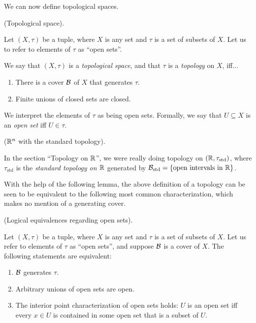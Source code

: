We can now define topological spaces.

\begin{defn}
    (Topological space).
    
    Let $(X, \tau)$ be a tuple, where $X$ is any set and $\tau$ is a set of subsets of $X$. Let us to refer to elements of $\tau$ as ``open sets''.
    
    We say that $(X, \tau)$ is a \textit{topological space}, and that $\tau$ is a \textit{topology} on $X$, iff...

    \begin{enumerate}
        \item There is a cover $\mathcal{B}$ of $X$ that generates $\tau$.
        \item Finite unions of closed sets are closed.
    \end{enumerate}

    We interpret the elements of $\tau$ as being open sets. Formally, we say that $U \subseteq X$ is an \textit{open set} iff $U \in \tau$.
\end{defn}

\begin{remark}
     ($\mathbb{R}^n$ with the standard topology).
     
     In the section ``Topology on $\mathbb{R}$'', we were really doing topology on $(\mathbb{R}, \tau_{\text{std}})$, where $\tau_{\text{std}}$ is the \textit{standard topology on $\mathbb{R}$} generated by $\mathcal{B}_{\text{std}} = \{ \text{open intervals in $\mathbb{R}$} \}$.
\end{remark}

With the help of the following lemma, the above definition of a topology can be seen to be equivalent to the following most common characterization, which makes no mention of a generating cover.

\begin{lemma}
\label{ch::topology::lemma:logical_equiv_open_sets}
    (Logical equivalences regarding open sets).

    Let $(X, \tau)$ be a tuple, where $X$ is any set and $\tau$ is a set of subsets of $X$. Let us refer to elements of $\tau$ as ``open sets'', and suppose $\mathcal{B}$ is a cover of $X$. The following statements are equivalent:
    
    \begin{enumerate}
        \item $\mathcal{B}$ generates $\tau$.
        \item Arbitrary unions of open sets are open.
        \item The interior point characterization of open sets holds: $U$ is an open set iff every $x \in U$ is contained in some open set that is a subset of $U$.
    \end{enumerate}
\end{lemma}

